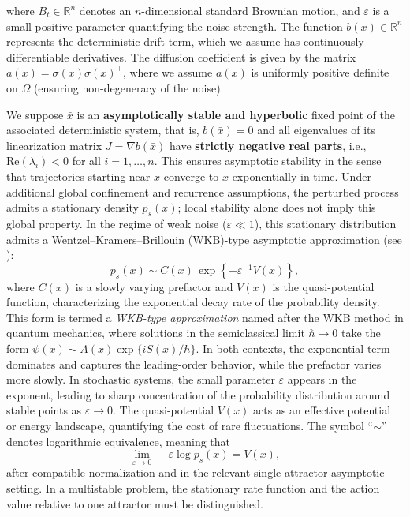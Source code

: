 \documentclass[11pt]{article}
\theoremstyle{plain}      %
\theoremstyle{definition} %
\begin{document}
where $B_t \in \mathbb{R}^n$ denotes an $n$-dimensional standard Brownian motion, and $\varepsilon$ is a small positive parameter quantifying the noise strength. The function $b(x) \in \mathbb{R}^n$ represents the deterministic drift term, which we assume has continuously differentiable derivatives. The diffusion coefficient is given by the matrix $a(x) = \sigma(x)\sigma(x)^\top$, where we assume $a(x)$ is uniformly positive definite on $\Omega$ (ensuring non-degeneracy of the noise).

We suppose $\bar{x}$ is an \textbf{asymptotically stable and hyperbolic} fixed point of the associated deterministic system, that is, $b(\bar{x}) = 0$ and all eigenvalues of its linearization matrix $J = \nabla b(\bar{x})$ have \textbf{strictly negative real parts}, i.e., $\text{Re}(\lambda_i) < 0$ for all $i = 1,\ldots,n$. This ensures asymptotic stability in the sense that trajectories starting near $\bar{x}$ converge to $\bar{x}$ exponentially in time. Under additional global confinement and recurrence assumptions, the perturbed process admits a stationary density $p_s(x)$; local stability alone does not imply this global property. In the regime of weak noise ($\varepsilon \ll 1$), this stationary distribution admits a Wentzel--Kramers--Brillouin (WKB)-type asymptotic approximation (see \cite{chen2017singularities,li2022machine,smelyanskiy1997topological}):
\begin{equation}
\label{WKB}
p_s(x) \sim C(x)\, \exp\left\{-\varepsilon^{-1} V(x)\right\},
\end{equation}
where \( C(x) \) is a slowly varying prefactor and \( V(x) \) is the quasi-potential function, characterizing the exponential decay rate of the probability density. This form is termed a \emph{WKB-type approximation} named after the WKB method in quantum mechanics, where solutions in the semiclassical limit \( \hbar \to 0 \) take the form \( \psi(x) \sim A(x)\exp\{i S(x)/\hbar\} \). In both contexts, the exponential term dominates and captures the leading-order behavior, while the prefactor varies more slowly. In stochastic systems, the small parameter \( \varepsilon \) appears in the exponent, leading to sharp concentration of the probability distribution around stable points as \( \varepsilon \to 0 \). The quasi-potential \( V(x) \) acts as an effective potential or energy landscape, quantifying the cost of rare fluctuations. The symbol ``\( \sim \)'' denotes logarithmic equivalence, meaning that
\[
\lim_{\varepsilon \to 0}-\varepsilon\log p_s(x)=V(x),
\]
after compatible normalization and in the relevant single-attractor asymptotic setting. In a multistable problem, the stationary rate function and the action value relative to one attractor must be distinguished.
\end{document}
